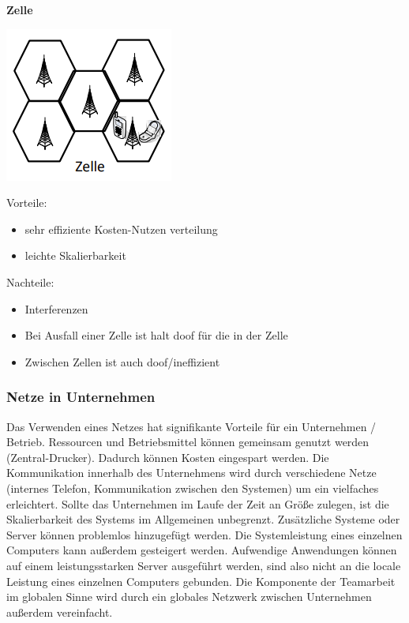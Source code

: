 \documentclass[12pt,a4paper]{article}
\begin{document}
			\begin{minipage}[t]{.48\textwidth}
				\textbf{Zelle}
				\begin{flushright}
					\begin{center}
						\includegraphics[scale=0.85]{Bilder/Zelle-topologie.png}
					\end{center}
				\end{flushright}
				\footnotesize Vorteile:
				\begin{itemize}
					\footnotesize
					\item sehr effiziente Kosten-Nutzen verteilung
					\item leichte Skalierbarkeit
				\end{itemize}
				\footnotesize Nachteile:
				\begin{itemize}
					\footnotesize
					\item Interferenzen
					\item Bei Ausfall einer Zelle ist halt doof für die in der Zelle
					\item Zwischen Zellen ist auch doof/ineffizient
				\end{itemize}
			\end{minipage}
		
		\subsubsection{Netze in Unternehmen}
			Das Verwenden eines Netzes hat signifikante Vorteile für ein Unternehmen / Betrieb. Ressourcen und Betriebsmittel können gemeinsam genutzt werden (Zentral-Drucker). Dadurch können Kosten eingespart werden. Die Kommunikation innerhalb des Unternehmens wird durch verschiedene Netze (internes Telefon, Kommunikation zwischen den Systemen) um ein vielfaches erleichtert. Sollte das Unternehmen im Laufe der Zeit an Größe zulegen, ist die Skalierbarkeit des Systems im Allgemeinen unbegrenzt. Zusätzliche Systeme oder Server können problemlos hinzugefügt werden. Die Systemleistung eines einzelnen Computers kann außerdem gesteigert werden. Aufwendige Anwendungen können auf einem leistungsstarken Server ausgeführt werden, sind also nicht an die locale Leistung eines einzelnen Computers gebunden. Die Komponente der Teamarbeit im globalen Sinne wird durch ein globales Netzwerk zwischen Unternehmen außerdem vereinfacht.
		
\end{document}

